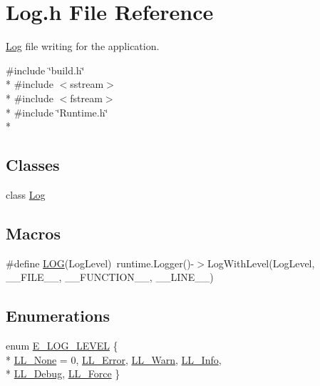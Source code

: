 \section{Log.\-h File Reference}
\label{_log_8h}


\hyperlink{class_log}{Log} file writing for the application.  


{\ttfamily \#include \char`\"{}build.\-h\char`\"{}}\\*
{\ttfamily \#include $<$sstream$>$}\\*
{\ttfamily \#include $<$fstream$>$}\\*
{\ttfamily \#include \char`\"{}Runtime.\-h\char`\"{}}\\*
\subsection*{Classes}
\begin{DoxyCompactItemize}
\item 
class \hyperlink{class_log}{Log}
\end{DoxyCompactItemize}
\subsection*{Macros}
\begin{DoxyCompactItemize}
\item 
\#define \hyperlink{_log_8h_a0b7fe247d21ea2cda560075ca24c2ba0}{L\-O\-G}(Log\-Level)~runtime.\-Logger()-\/$>$Log\-With\-Level(Log\-Level, \-\_\-\-\_\-\-F\-I\-L\-E\-\_\-\-\_\-, \-\_\-\-\_\-\-F\-U\-N\-C\-T\-I\-O\-N\-\_\-\-\_\-, \-\_\-\-\_\-\-L\-I\-N\-E\-\_\-\-\_\-)
\end{DoxyCompactItemize}
\subsection*{Enumerations}
\begin{DoxyCompactItemize}
\item 
enum \hyperlink{_log_8h_a1ffd9698eb630ed3e706a67e39aea25d}{E\-\_\-\-L\-O\-G\-\_\-\-L\-E\-V\-E\-L} \{ \\*
\hyperlink{_log_8h_a1ffd9698eb630ed3e706a67e39aea25da9968c8ca2578aff4f85fc87f9b3fdac8}{L\-L\-\_\-\-None} = 0, 
\hyperlink{_log_8h_a1ffd9698eb630ed3e706a67e39aea25da5d825934ff43b673c8a03cbedbddadeb}{L\-L\-\_\-\-Error}, 
\hyperlink{_log_8h_a1ffd9698eb630ed3e706a67e39aea25da53c2123edba118e488fbe628cf5e44ec}{L\-L\-\_\-\-Warn}, 
\hyperlink{_log_8h_a1ffd9698eb630ed3e706a67e39aea25dac0cb3567fd08a04b91a9c302fe2b02fe}{L\-L\-\_\-\-Info}, 
\\*
\hyperlink{_log_8h_a1ffd9698eb630ed3e706a67e39aea25da8d3821f8f9c2f7caed5f6ff930bef2fb}{L\-L\-\_\-\-Debug}, 
\hyperlink{_log_8h_a1ffd9698eb630ed3e706a67e39aea25daf3f8f1cde9f6cc7728d8f271da2a8da7}{L\-L\-\_\-\-Force}
 \}
\end{DoxyCompactItemize}


